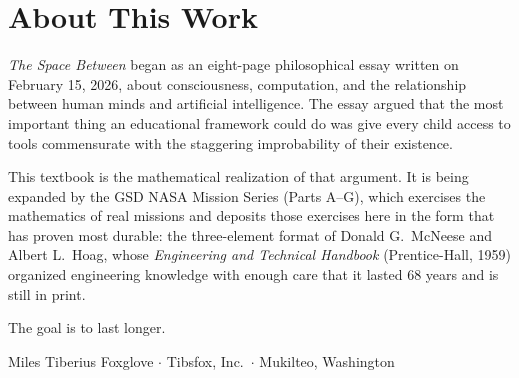 \documentclass[11pt,letterpaper]{book}
\begin{document}
\mainmatter













\appendix




\backmatter
\chapter*{About This Work}

\textit{The Space Between} began as an eight-page philosophical essay written on February 15, 2026, about consciousness, computation, and the relationship between human minds and artificial intelligence. The essay argued that the most important thing an educational framework could do was give every child access to tools commensurate with the staggering improbability of their existence.

This textbook is the mathematical realization of that argument. It is being expanded by the GSD NASA Mission Series (Parts A--G), which exercises the mathematics of real missions and deposits those exercises here in the form that has proven most durable: the three-element format of Donald G.\ McNeese and Albert L.\ Hoag, whose \textit{Engineering and Technical Handbook} (Prentice-Hall, 1959) organized engineering knowledge with enough care that it lasted 68 years and is still in print.

The goal is to last longer.

\vspace{2em}
\begin{center}
\textcolor{subtlegray}{\small\sffamily Miles Tiberius Foxglove $\cdot$ Tibsfox, Inc.\ $\cdot$ Mukilteo, Washington}
\end{center}
\end{document}
